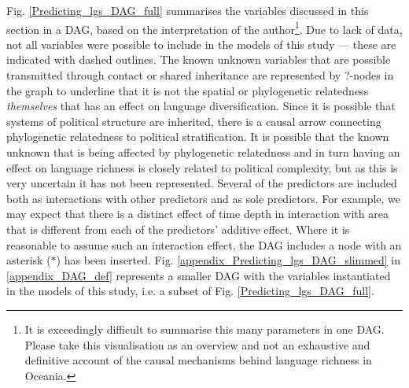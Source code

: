 \documentclass[unnumsec,webpdf,modern,medium]{oup-authoring-template}
\begin{document}
Fig. \ref{Predicting_lgs_DAG_full} summarises the variables discussed in this section in a DAG, based on the interpretation of the author\footnote{It is exceedingly difficult to summarise this many parameters in one DAG. Please take this visualisation as an overview and not an exhaustive and definitive account of the causal mechanisms behind language richness in Oceania.}. Due to lack of data, not all variables were possible to include in the models of this study --- these are indicated with dashed outlines. The known unknown variables that are possible transmitted through contact or shared inheritance are represented by ?-nodes in the graph to underline that it is not the spatial or phylogenetic relatedness \emph{themselves} that has an effect on language diversification. Since it is possible that systems of political structure are inherited, there is a causal arrow connecting phylogenetic relatedness to political stratification. It is possible that the known unknown that is being affected by phylogenetic relatedness and in turn having an effect on language richness is closely related to political complexity, but as this is very uncertain it has not been represented. Several of the predictors are included both as interactions with other predictors and as sole predictors. For example, we may expect that there is a distinct effect of time depth in interaction with area that is different from each of the predictors' additive effect. Where it is reasonable to assume such an interaction effect, the DAG includes a node with an asterisk ($\ast$) has been inserted. Fig. \ref{appendix_Predicting_lgs_DAG_slimmed} in \ref{appendix_DAG_def} represents a smaller DAG with the variables instantiated in the models of this study, i.e. a subset of Fig. \ref{Predicting_lgs_DAG_full}.
\end{document}
